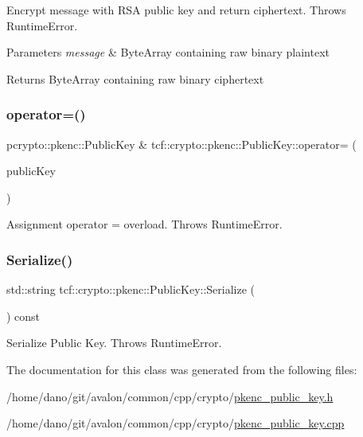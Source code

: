Encrypt message with R\+SA public key and return ciphertext. Throws Runtime\+Error.


\begin{DoxyParams}{Parameters}
{\em message} & Byte\+Array containing raw binary plaintext \\
\hline
\end{DoxyParams}
\begin{DoxyReturn}{Returns}
Byte\+Array containing raw binary ciphertext 
\end{DoxyReturn}
\mbox{\label{classtcf_1_1crypto_1_1pkenc_1_1PublicKey_a2dbd79b40f6b26d52c03a2d8f438d2c5}} 
\subsubsection{\texorpdfstring{operator=()}{operator=()}}
{\footnotesize\ttfamily pcrypto\+::pkenc\+::\+Public\+Key \& tcf\+::crypto\+::pkenc\+::\+Public\+Key\+::operator= (\begin{DoxyParamCaption}\item[{const \hyperlink{classtcf_1_1crypto_1_1pkenc_1_1PublicKey}{Public\+Key} \&}]{public\+Key }\end{DoxyParamCaption})}

Assignment operator = overload. Throws Runtime\+Error. \mbox{\label{classtcf_1_1crypto_1_1pkenc_1_1PublicKey_a8d719a04c643cfc4b6fb51c4574ce920}} 
\subsubsection{\texorpdfstring{Serialize()}{Serialize()}}
{\footnotesize\ttfamily std\+::string tcf\+::crypto\+::pkenc\+::\+Public\+Key\+::\+Serialize (\begin{DoxyParamCaption}{ }\end{DoxyParamCaption}) const}

Serialize Public Key. Throws Runtime\+Error. 

The documentation for this class was generated from the following files\+:\begin{DoxyCompactItemize}
\item 
/home/dano/git/avalon/common/cpp/crypto/\hyperlink{pkenc__public__key_8h}{pkenc\+\_\+public\+\_\+key.\+h}\item 
/home/dano/git/avalon/common/cpp/crypto/\hyperlink{pkenc__public__key_8cpp}{pkenc\+\_\+public\+\_\+key.\+cpp}\end{DoxyCompactItemize}

